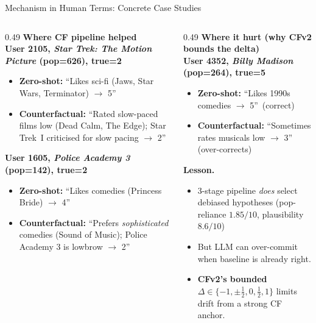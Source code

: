 \documentclass[aspectratio=169,10pt]{beamer}
\newcommand{\good}[1]{\textcolor{goodgreen}{\textbf{#1}}}
\newcommand{\bad}[1]{\textcolor{badred}{\textbf{#1}}}
\newcommand{\cf}[1]{\textcolor{cfblue}{\textbf{#1}}}
\begin{document}
\begin{frame}{Mechanism in Human Terms: Concrete Case Studies}
  \small
  \begin{columns}[T,onlytextwidth]
    \begin{column}{0.49\textwidth}
      \textbf{\good{Where CF pipeline helped}}\\[0.2em]
      \footnotesize
      \textbf{User 2105, \emph{Star Trek: The Motion Picture} (pop=626), true=2}
      \begin{itemize}\itemsep0pt
        \item \bad{Zero-shot:} ``Likes sci-fi (Jaws, Star Wars, Terminator) $\to$ 5''
        \item \good{Counterfactual:} ``Rated slow-paced films low (Dead Calm, The Edge); Star Trek~I criticised for slow pacing $\to$ 2''
      \end{itemize}
      \vspace{0.4em}
      \textbf{User 1605, \emph{Police Academy 3} (pop=142), true=2}
      \begin{itemize}\itemsep0pt
        \item \bad{Zero-shot:} ``Likes comedies (Princess Bride) $\to$ 4''
        \item \good{Counterfactual:} ``Prefers \emph{sophisticated} comedies (Sound of Music); Police Academy 3 is lowbrow $\to$ 2''
      \end{itemize}
    \end{column}
    \begin{column}{0.49\textwidth}
      \textbf{\bad{Where it hurt (why CFv2 bounds the delta)}}\\[0.2em]
      \footnotesize
      \textbf{User 4352, \emph{Billy Madison} (pop=264), true=5}
      \begin{itemize}\itemsep0pt
        \item \good{Zero-shot:} ``Likes 1990s comedies $\to$ 5'' \,(correct)
        \item \bad{Counterfactual:} ``Sometimes rates musicals low $\to$ 3'' \,(over-corrects)
      \end{itemize}
      \vspace{0.6em}
      \textbf{Lesson.}
      \begin{itemize}\itemsep0pt
        \item 3-stage pipeline \emph{does} select debiased hypotheses (pop-reliance $1.85/10$, plausibility $8.6/10$)
        \item But LLM can over-commit when baseline is already right.
        \item \cf{CFv2's bounded $\Delta\in\{-1,\pm\tfrac12,0,\tfrac12,1\}$} limits drift from a strong CF anchor.
      \end{itemize}
    \end{column}
  \end{columns}
\end{frame}
\end{document}

